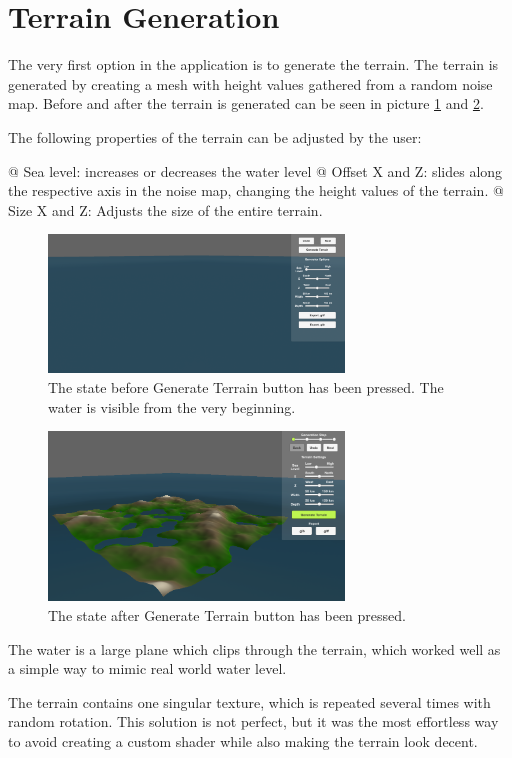 \section{Terrain Generation}

The very first option in the application is to generate the terrain.
The terrain is generated by creating a mesh with height values gathered from a random noise map.
Before and after the terrain is generated can be seen in picture \ref{fig:no_terr} and \ref{fig:terr}.

The following properties of the terrain can be adjusted by the user:

\begin{easylist}
 @ Sea level: increases or decreases the water level
 @ Offset X and Z: slides along the respective axis in the noise map, changing the height values of the terrain.
 @ Size X and Z: Adjusts the size of the entire terrain.
\end{easylist}

\begin{figure}[H]
  \centering

  \includegraphics[width=0.7\textwidth]{figure/terrain_not_generated.png}
  \caption{The state before Generate Terrain button has been pressed. The water is visible from the very beginning.}

  \label{fig:no_terr}
\end{figure}

\begin{figure}[H]
  \centering

  \includegraphics[width=0.7\textwidth]{figure/terrain_generated.png}
  \caption{The state after Generate Terrain button has been pressed.}

  \label{fig:terr}
\end{figure}

 
The water is a large plane which clips through the terrain, which worked well as a simple way to mimic real world water level.

The terrain contains one singular texture, which is repeated several times with random rotation.
This solution is not perfect, but it was the most effortless way to avoid creating a custom shader while also making the terrain look decent.
